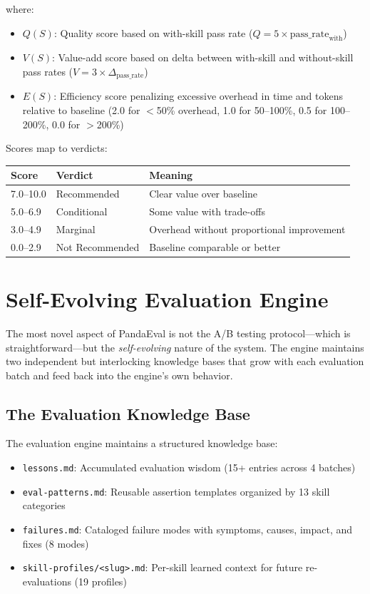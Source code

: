\documentclass[11pt,a4paper]{article}
\begin{document}
where:
\begin{itemize}[leftmargin=*]
    \item $Q(S)$: Quality score based on with-skill pass rate ($Q = 5 \times \text{pass\_rate}_{\text{with}}$)
    \item $V(S)$: Value-add score based on delta between with-skill and without-skill pass rates ($V = 3 \times \Delta_{\text{pass\_rate}}$)
    \item $E(S)$: Efficiency score penalizing excessive overhead in time and tokens relative to baseline (2.0 for $<$50\% overhead, 1.0 for 50--100\%, 0.5 for 100--200\%, 0.0 for $>$200\%)
\end{itemize}

Scores map to verdicts:
\begin{center}
\begin{tabular}{lll}
\toprule
\textbf{Score} & \textbf{Verdict} & \textbf{Meaning} \\
\midrule
7.0--10.0 & Recommended & Clear value over baseline \\
5.0--6.9 & Conditional & Some value with trade-offs \\
3.0--4.9 & Marginal & Overhead without proportional improvement \\
0.0--2.9 & Not Recommended & Baseline comparable or better \\
\bottomrule
\end{tabular}
\end{center}

\section{Self-Evolving Evaluation Engine}
\label{sec:selfevolve}

The most novel aspect of PandaEval is not the A/B testing protocol---which is straightforward---but the \emph{self-evolving} nature of the system. The engine maintains two independent but interlocking knowledge bases that grow with each evaluation batch and feed back into the engine's own behavior.

\subsection{The Evaluation Knowledge Base}

The evaluation engine maintains a structured knowledge base:

\begin{itemize}[leftmargin=*]
    \item \texttt{lessons.md}: Accumulated evaluation wisdom (15+ entries across 4 batches)
    \item \texttt{eval-patterns.md}: Reusable assertion templates organized by 13 skill categories
    \item \texttt{failures.md}: Cataloged failure modes with symptoms, causes, impact, and fixes (8 modes)
    \item \texttt{skill-profiles/<slug>.md}: Per-skill learned context for future re-evaluations (19 profiles)
\end{itemize}
\end{document}
